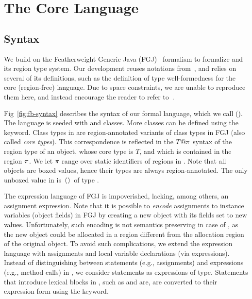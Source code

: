 \section{The Core Language}
\label{sec:type-system}






\subsection{Syntax}
\label{sec:fb-syntax}

We build on the Featherweight Generic Java (FGJ)~\cite{fgj} formalism
to formalize \name and its region type system. Our development reuses
notations from~\cite{fgj}, and relies on several of its definitions,
such as the definition of type well-formedness for the core
(region-free) language. Due to space constraints, we are unable to
reproduce them here, and instead encourage the reader to refer
to~\cite{fgj}.

Fig~\ref{fig:fb-syntax} describes the syntax of our formal language,
which we call \fbname (\FB). The language is seeded with \ObjZ and
\RgnZ classes. More classes can be defined using the 
keyword. Class types in \FB are region-annotated variants of class
types in FGJ (also called \emph{core types}). This correspondence is
reflected in the $T@\pi$ syntax of the region type of an object,
whose core type is $T$, and which is contained in the region $\pi$.
We let $\pi$ range over static identifiers of regions in \FB. Note
that all \FB objects are boxed values, hence their \FB types are
always region-annotated. The only unboxed value in \FB is $\,{\tt ()}\,$
of type \unitZ.

The expression language of FGJ is impoverished, lacking, among others,
an assignment expression. Note that it is possible to \emph{encode}
assignments to instance variables (object fields) in FGJ by creating a
new object with its fields set to new values. Unfortunately, such
encoding is not semantics preserving in case of \name, as the new
object could be allocated in a region different from the allocation
region of the original object. To avoid such complications, we extend
the expression language with assignments and local variable
declarations (via  expressions). Instead of distinguishing
between statements (e.g., assignments) and expressions (e.g., method
calls) in \FB, we consider statements as expressions of \unitZ type.
Statements that introduce lexical blocks in \name, such as
 and  are, are converted to their expression form
using the  keyword.

